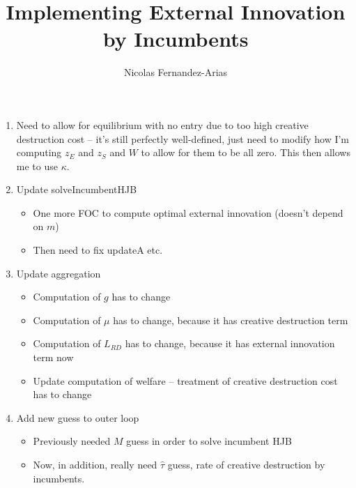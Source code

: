 \documentclass[12pt,english]{article}
\theoremstyle{remark}
\begin{document}
	
\title{Implementing External Innovation by Incumbents}
\author{Nicolas Fernandez-Arias}
\maketitle


\begin{enumerate}
	\item Need to allow for equilibrium with no entry due to too high creative destruction cost -- it's still perfectly well-defined, just need to modify how I'm computing $z_E$ and $z_S$ and $W$ to allow for them to be all zero. This then allows me to use $\kappa$. 
	\item Update solveIncumbentHJB
	\begin{itemize}
		\item One more FOC to compute optimal external innovation (doesn't depend on $m$)
		\item Then need to fix updateA etc.
	\end{itemize}
	\item Update aggregation 
	\begin{itemize}
		\item Computation of $g$ has to change
		\item Computation of $\mu$ has to change, because it has creative destruction term
		\item Computation of $L_{RD}$ has to change, because it has external innovation term now
		\item Update computation of welfare -- treatment of creative destruction cost has to change
	\end{itemize}
	\item Add new guess to outer loop
	\begin{itemize}
		\item Previously needed $M$ guess in order to solve incumbent HJB
		\item Now, in addition, really need $\hat{\tau}$ guess, rate of creative destruction by incumbents. 
	\end{itemize}
\end{enumerate}
\end{document}
